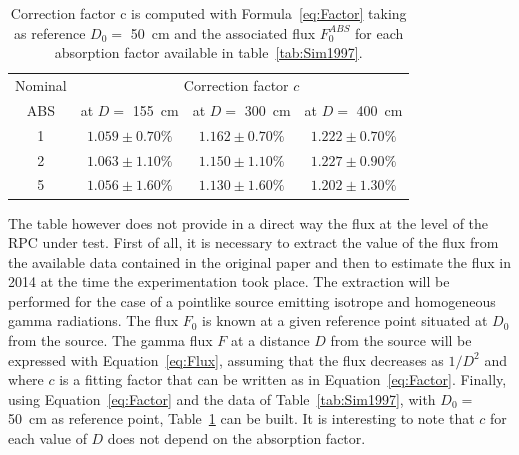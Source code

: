 \newpage
	
\begingroup\setlength{\intextsep}{5pt}\setlength{\columnsep}{15pt}
	
	\begin{table}
		\centering
		\begin{tabular}{|*{4}{c|}}
			\hline
			Nominal & \multicolumn{3}{c|}{Correction factor $c$} \\
			ABS & at $D=$ \SI{155}{cm} & at $D=$ \SI{300}{cm} & at $D=$ \SI{400}{cm} \\
			\hline
			1 & $1.059 \pm 0.70\%$ & $1.162 \pm 0.70\%$ & $1.222 \pm 0.70\%$ \\
			\hline
			2 & $1.063 \pm 1.10\%$ & $1.150 \pm 1.10\%$ & $1.227 \pm 0.90\%$ \\
			\hline
			5 & $1.056 \pm 1.60\%$ & $1.130 \pm 1.60\%$ & $1.202 \pm 1.30\%$ \\
			\hline
		\end{tabular}
		\caption{\label{tab:CorrFactor} Correction factor c is computed with Formula~\ref{eq:Factor} taking as reference $D_0 =$ \SI{50}{cm} and the associated flux $F_0^{ABS}$ for each absorption factor available in table~\ref{tab:Sim1997}.}
	\end{table}
	
	The table however does not provide in a direct way the flux at the level of the RPC under test. First of all, it is necessary to extract the value of the flux from the available data contained in the original paper and then to estimate the flux in 2014 at the time the experimentation took place. The extraction will be performed for the case of a pointlike source emitting isotrope and homogeneous gamma radiations. The flux $F_0$ is known at a given reference point situated at $D_0$ from the source. The gamma flux $F$ at a distance $D$ from the source will be expressed with Equation~\ref{eq:Flux}, assuming that the flux decreases as $1/D^2$ and where $c$ is a fitting factor that can be written as in Equation~\ref{eq:Factor}. Finally, using Equation~\ref{eq:Factor} and the data of Table~\ref{tab:Sim1997}, with $D_0=$ \SI{50}{cm} as reference point, Table~\ref{tab:CorrFactor} can be built. It is interesting to note that $c$ for each value of $D$ does not depend on the absorption factor.

\endgroup
	
